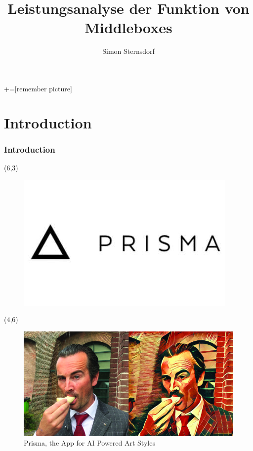 \documentclass{beamer} %
\author{Simon Sternsdorf}
\title{Leistungsanalyse der Funktion von Middleboxes}
\begin{document}



+=[remember picture]

\everymath{\displaystyle}
\begin{frame}
\titlepage
\end{frame}



\section{Introduction}
\begin{frame}
\frametitle{Introduction}


\begin{textblock}{1}(6,3)
	\begin{figure}
	\includegraphics[scale=0.2]{figures/Prisma}

	\end{figure}
	
 \end{textblock}


\begin{textblock}{5}(4,6)
	\begin{figure}
	\includegraphics[scale=1]{figures/prisma2}
	\caption{Prisma, the App for AI Powered Art Styles}
	\end{figure}
 \end{textblock} 

\end{frame}
\end{document}
